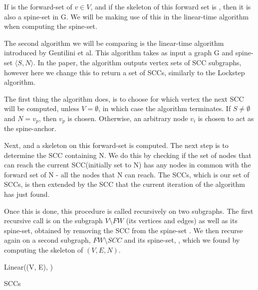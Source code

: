 \documentclass[../master/master.tex]{subfiles}
\begin{document}
If  is the forward-set of $v \in V$, and if the skeleton of this forward set is , then it is also a spine-set in G. We will be making use of this in the linear-time algorithm when computing the spine-set.



The second algorithm we will be comparing is the linear-time algorithm \cite{linear} introduced by Gentilini et al. This algorithm takes as input a graph G and spine-set $\langle S, N\rangle$. In the paper, the algorithm outputs vertex sets of SCC subgraphs, however here we change this to return a set of SCCs, similarly to the Lockstep algorithm.

The first thing the algorithm does, is to choose for which vertex the next SCC will be computed, unless $V=\emptyset$, in which case the algorithm terminates. If $S\neq\emptyset$ and $N={v_p}$, then $v_p$ is chosen. Otherwise, an arbitrary node $v_i$ is chosen to act as the spine-anchor.

Next,  and a skeleton  on this forward-set is computed. The next step is to determine the SCC containing N. We do this by checking if the set of nodes that can reach the current SCC(initially set to N) has any nodes in common with the forward set of N - all the nodes that N can reach. The SCCs, which is our set of SCCs, is then extended by the SCC that the current iteration of the algorithm has just found.

Once this is done, this procedure is called recursively on two subgraphs. The first recursive call is on the subgraph $V\setminus FW$ (its vertices and edges) as well as its spine-set, obtained by removing the SCC from the spine-set . We then recurse again on a second subgraph, $FW\setminus SCC$ and its spine-set, , which we found by computing the skeleton of $(V, E, N)$.

\begin{algorithm}[h!]
  \caption{Linear((V, E), )}
  \begin{algorithmic}[1]
     \State \Return
    \EndIf
    \Statex
    \EndIf
    \Statex
    \Statex
    \EndWhile
    \Statex
    \Statex
    \Statex
    \State \Return SCCs
  \end{algorithmic}
\end{algorithm}
\end{document}
